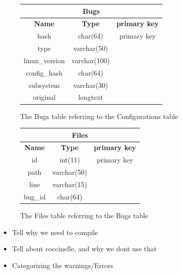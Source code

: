 \documentclass[a4paper,11pt]{report}
\newcommand{\figa}{
    \begin{figure}[!htpb]
    \centering
}
\newcommand{\figb}[2]{
    \caption{#1}
    \label{#2}
    \end{figure}
}
\begin{document}
\figa
    \begin{tabular}{c|c|c}
        \hline
        \hline
        \multicolumn{3}{c}{\textbf{Bugs}} \\
        \hline
        \textbf{Name} & \textbf{Type} &\textbf{primary key} \\
        \hline
        hash & char(64) & primary key \\
        type & varchar(50) \\
        linux\_version & varchar(100) \\
        config\_hash & char(64) \\
        subsystem & varchar(30) \\
        original & longtext \\
        \hline
        \hline
    \end{tabular}
\figb{The Bugs table referring to the Configurations table}{fig:bugstable}

\figa
    \begin{tabular}{c|c|c}
        \hline
        \hline
        \multicolumn{3}{c}{\textbf{Files}} \\
        \hline
        \textbf{Name} & \textbf{Type} &\textbf{primary key} \\
        \hline
        id & int(11) & primary key \\
        path & varchar(50) \\
        line & varchar(15) \\
        bug\_id & char(64) \\
        \hline
        \hline
    \end{tabular}
\figb{The Files table referring to the Bugs table}{fig:filestable}

\begin{itemize}
    \item Tell why we need to compile
    \item Tell about coccinelle, and why we dont use that
    \item Categorizing the warnings/Errors
\end{itemize}




\newpage
\end{document}
